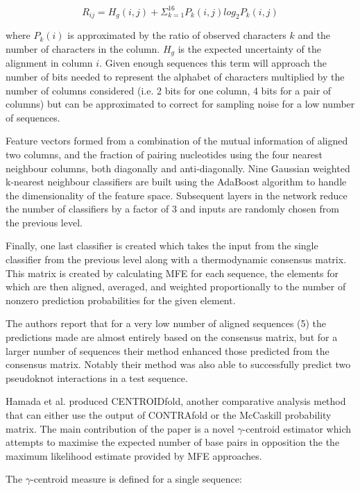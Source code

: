 \documentclass[journal]{IEEEtran}
\begin{document}
\begin{equation}
	R_{ij} = H_g(i, j) + \Sigma_{k=1}^{16} P_k(i, j) log_2 P_k(i, j)
\end{equation}

where $P_k(i)$ is approximated by the ratio of observed characters $k$ and the  number of characters in the column. $H_g$ is the expected uncertainty of the alignment in column $i$. Given enough sequences this term will approach the number of bits needed to represent the alphabet of characters multiplied by the number of columns considered (i.e. 2 bits for one column, 4 bits for a pair of columns) but can be approximated to correct for sampling noise for a low number of sequences.

Feature vectors formed from a combination of the mutual information of aligned two columns, and the fraction of pairing nucleotides using the four nearest neighbour columns, both diagonally and anti-diagonally. Nine Gaussian weighted k-nearest neighbour classifiers are built using the AdaBoost algorithm to handle the dimensionality of the feature space. Subsequent layers in the network reduce the number of classifiers by a factor of 3 and inputs are randomly chosen from the previous level. 

Finally, one last classifier is created which takes the input from the single classifier from the previous level along with a thermodynamic consensus matrix. This matrix is created by calculating MFE for each sequence, the elements for which are then aligned, averaged, and weighted proportionally to the number of nonzero prediction probabilities for the given element.

The authors report that for a very low number of aligned sequences (5) the predictions made are almost entirely based on the consensus matrix, but for a larger number of sequences their method enhanced those predicted from the consensus matrix. Notably their method was also able to successfully predict two pseudoknot interactions in a test sequence.

Hamada et al. \cite{hamada2009prediction, sato2009centroidfold} produced CENTROIDfold, another comparative analysis method that can either use the output of CONTRAfold or the McCaskill probability matrix. The main contribution of the paper is a novel $\gamma$-centroid estimator which attempts to maximise the expected number of base pairs in opposition the the maximum likelihood estimate provided by MFE approaches. 

The $\gamma$-centroid measure is defined for a single sequence:
\end{document}

